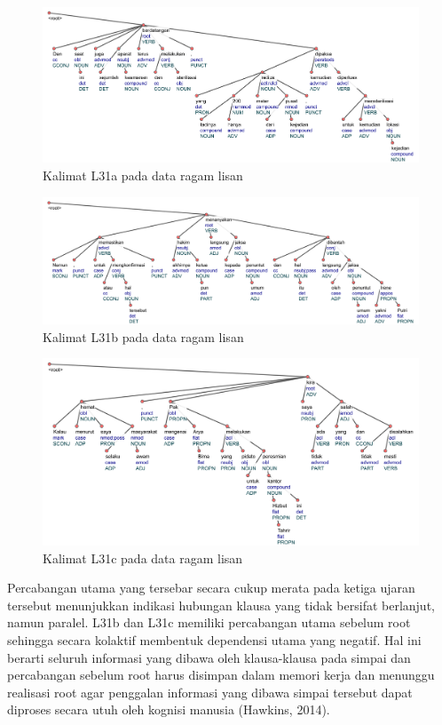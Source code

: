 \begin{figure}
	\centering \includegraphics[width=1
	\textwidth] {pics/ls1716.jpg} 
	\caption{Kalimat L31a pada data ragam lisan} 
	\label{fig:ls1716} 
\end{figure}

\begin{figure}
	\centering \includegraphics[width=1
	\textwidth] {pics/ls16.jpg} 
	\caption{Kalimat L31b pada data ragam lisan}
	\label{fig:ls16} 
\end{figure}

\begin{figure}
	\centering \includegraphics[width=1
	\textwidth] {pics/ls114.jpg} 
	\caption{Kalimat L31c pada data ragam lisan}
	\label{fig:ls114} 
\end{figure}

Percabangan utama yang tersebar secara cukup merata pada ketiga ujaran tersebut menunjukkan indikasi hubungan klausa yang tidak bersifat berlanjut, namun paralel. L31b dan L31c memiliki percabangan utama sebelum root sehingga secara kolaktif membentuk dependensi utama yang negatif. Hal ini berarti seluruh informasi yang dibawa oleh klausa-klausa pada simpai dan percabangan sebelum root harus disimpan dalam memori kerja dan menunggu realisasi root agar penggalan informasi yang dibawa simpai tersebut dapat diproses secara utuh oleh kognisi manusia (Hawkins, 2014).

